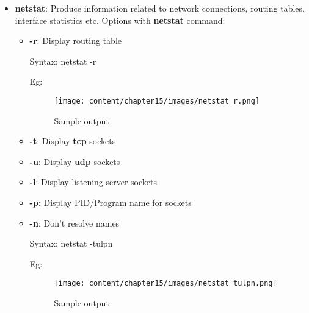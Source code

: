 \setlength{\columnsep}{3pt}
\begin{flushleft}

\bigskip

\begin{itemize}
	\item \textbf{netstat}: Produce information related to network connections, routing tables, interface statistics etc.
	\newline
	Options with \textbf{netstat} command:
	\begin{itemize}
		\item \textbf{-r}: Display routing table
		\bigskip
		\begin{tcolorbox}[breakable,notitle,boxrule=0pt,colback=pink,colframe=pink]
			\color{black}
			\font=9pt
			Syntax: netstat -r
			\font=4pt
		\end{tcolorbox}
		Eg:
		\begin{figure}[h!]
			\centering
			\texttt{[image: content/chapter15/images/netstat\_r.png]}
			\caption{Sample output}
			\label{fig:output5}
		\end{figure}

		\item \textbf{-t}: Display \textbf{tcp} sockets
		\item \textbf{-u}: Display \textbf{udp} sockets
		\item \textbf{-l}: Display listening server sockets
		\item \textbf{-p}: Display PID/Program name for sockets
		\item \textbf{-n}: Don't resolve names
		\bigskip
		\begin{tcolorbox}[breakable,notitle,boxrule=0pt,colback=pink,colframe=pink]
			\color{black}
			\font=9pt
			Syntax: netstat -tulpn
			\font=4pt
		\end{tcolorbox}
		Eg:
		\begin{figure}[h!]
			\centering
			\texttt{[image: content/chapter15/images/netstat\_tulpn.png]}
			\caption{Sample output}
			\label{fig:output6}
		\end{figure}
			

\end{itemize}
\end{itemize}
\end{flushleft}
